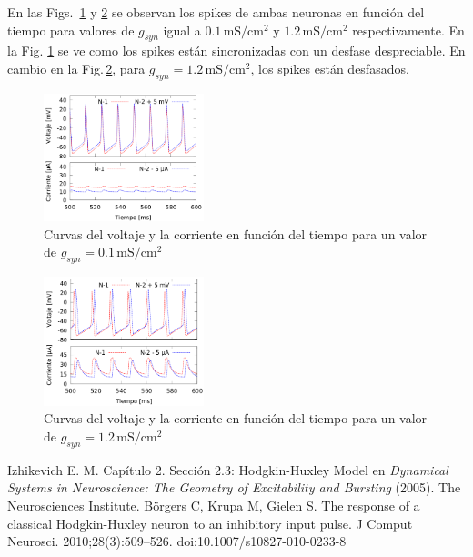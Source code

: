     En las Figs.\, \ref{fig:gsyn0-1} y \ref{fig:gsyn1-2} se observan los spikes de ambas neuronas en función del tiempo para valores de $g_{syn}$ igual a $0.1\,\text{mS}/\text{cm}^2$ y $1.2\,\text{mS}/\text{cm}^2$ respectivamente. En la Fig. \ref{fig:gsyn0-1} se ve como los spikes están sincronizadas con un desfase despreciable. %
    En cambio en la Fig.\,\ref{fig:gsyn1-2}, para $g_{syn}=1.2\,\text{mS}/\text{cm}^2$, los spikes están desfasados.
    \begin{figure}[H]
        \centering
        \includegraphics[width=0.415\textwidth]{current_15_in_gsyn_0-1.png}
        \caption{Curvas del voltaje y la corriente en función del tiempo para un valor de $g_{syn}=0.1\,\text{mS}/\text{cm}^2$}
        \label{fig:gsyn0-1}
    \end{figure}

        \begin{figure}[H]
        \centering
        \includegraphics[width=0.415\textwidth]{current_15_in_gsyn_1-2.png}
        \caption{Curvas del voltaje y la corriente en función del tiempo para un valor de $g_{syn}=1.2\,\text{mS}/\text{cm}^2$}
        \label{fig:gsyn1-2}
    \end{figure}



\begin{thebibliography}{50}
{} Izhikevich E. M. Capítulo 2. Sección 2.3: Hodgkin-Huxley Model en {\sl Dynamical Systems in Neuroscience: The Geometry of Excitability and Bursting} (2005).  The Neurosciences Institute.
 Börgers C, Krupa M, Gielen S. The response of a classical Hodgkin-Huxley neuron to an inhibitory input pulse. J Comput Neurosci. 2010;28(3):509–526. doi:10.1007/s10827-010-0233-8
\end{thebibliography}

